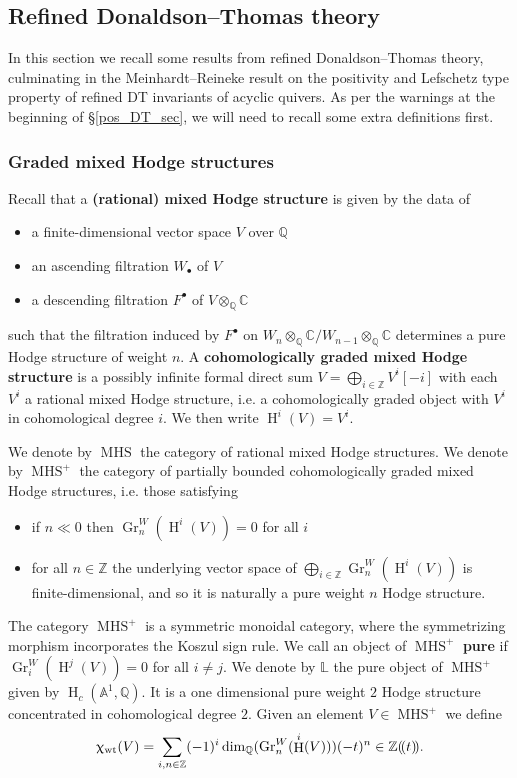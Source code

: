 \documentclass{amsart}
\newcommand{\LL}{\mathbb{L}}
\DeclareMathOperator{\MHS}{MHS}
\DeclareMathOperator{\Wt}{wt}
\DeclareMathOperator{\HO}{H}
\newcommand{\lcbs}{(\!(}
\newcommand{\rcbs}{)\!)}
\def\!{\mskip-\thinmuskip}
\let\bb=\mathbb
\renewcommand{\chi}{\upchi}
\theoremstyle{plain}%
\newcommand{\Gr}{\operatorname{Gr}}
\theoremstyle{definition}
\theoremstyle{remark}
\begin{document}
\subsection{Refined Donaldson--Thomas theory}
\label{ref_DT_sec}
In this section we recall some results from refined Donaldson--Thomas theory, culminating in the Meinhardt--Reineke result \cite{MeiRei} on the positivity and Lefschetz type property of refined DT invariants of acyclic quivers.  As per the warnings at the beginning of \S\ref{pos_DT_sec}, we will need to recall some extra definitions first.  
\subsubsection{Graded mixed Hodge structures}
Recall that a \textbf{(rational) mixed Hodge structure} is given by the data of
\begin{itemize}
    \item a finite-dimensional vector space $V$ over $\mathbb{Q}$
    \item an ascending filtration $W_{\bullet}$ of $V$
    \item a descending filtration $F^{\bullet}$ of $V\otimes_{\mathbb{Q}} \mathbb{C}$
\end{itemize}
such that the filtration induced by $F^{\bullet}$ on $W_{n}\otimes_{\mathbb{Q}}\mathbb{C}/W_{n-1}\otimes_{\mathbb{Q}}\mathbb{C}$ determines a pure Hodge structure of weight $n$.  A \textbf{cohomologically graded mixed Hodge structure} is a possibly infinite formal direct sum $V=\bigoplus_{i\in\mathbb{Z}}V^i[-i]$ with each $V^i$ a rational mixed Hodge structure, i.e. a cohomologically graded object with $V^i$ in cohomological degree $i$.  We then write $\HO^i(V)=V^i$.

We denote by $\MHS$ the category of rational mixed Hodge structures.  We denote by $\MHS^+$ the category of partially bounded cohomologically graded mixed Hodge structures, i.e. those satisfying  
\begin{itemize}
    \item if $n\ll 0$ then $\Gr^W_n(\HO^i(V))=0$ for all $i$
    \item for all $n\in \mathbb{Z}$ the underlying vector space of $\bigoplus_{i\in\mathbb{Z}}\Gr^W_n(\HO^i(V))$ is finite-dimensional, and so it is naturally a pure weight $n$ Hodge structure.
\end{itemize}
The category $\MHS^+$ is a symmetric monoidal category, where the symmetrizing morphism incorporates the Koszul sign rule.  We call an object of $\MHS^+$ \textbf{pure} if $\Gr^W_i(\HO^j(V))=0$ for all $i\neq j$.  We denote by $\LL$ the pure object of $\MHS^+$ given by $\HO_c(\mathbb{A}^1,\mathbb{Q})$.  It is a one dimensional pure weight $2$ Hodge structure concentrated in cohomological degree $2$.  Given an element $V\in \MHS^+$ we define
\[
\chi_{\Wt}(V)=\sum_{i,n\in \mathbb{Z}}(-1)^i\dim_{\bb{Q}}(\Gr^W_n(\HO^i(V)))(-t)^n\in\mathbb{Z}\lcbs t \rcbs.
\]
\end{document}

